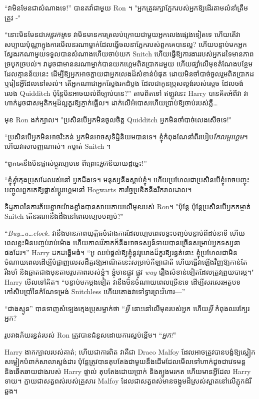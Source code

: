 “វាមិនមែនជាសំណាងទេ!” បាន​តវ៉ា​ជាមួយ Ron ។ "អ្នកត្រូវរក្សាភ្នែករបស់អ្នកឱ្យដើរតាមលំនាំត្រឹមត្រូវ -"

“នោះមិនមែនជា\emph{អន្តរកម្ម}ទេ វាមិនមានការត្រលប់ក្រោយជាមួយអ្នកលេងផ្សេងទៀតទេ ហើយតើវាសប្បាយប៉ុណ្ណាក្នុងការមើលនរណាម្នាក់ដែលធ្វើចលនាភ្នែករបស់ពួកគេបានល្អ? ហើយបន្ទាប់មកអ្នកស្វែងរកណាមួយទទួលបានសំណាងហើយចាប់យក Snitch ហើយធ្វើឱ្យការងាររបស់អ្នកដទៃមានភាពច្របូកច្របល់។ វាដូចជាមាននរណាម្នាក់បានយកហ្គេមពិតប្រាកដមួយ ហើយផ្សាំលើមុខតំណែងបន្ថែមដែលគ្មានន័យនេះ ដើម្បីឱ្យអ្នកអាចក្លាយជាអ្នកលេងដ៏សំខាន់បំផុត ដោយមិនចាំបាច់ចូលរួមពិតប្រាកដ ឬរៀនអ្វីដែលនៅសល់។ តើអ្នកណាជាអ្នកស្វែងរកដំបូង ដែលជាកូនប្រុសល្ងង់របស់ស្តេច ដែលចង់លេង Quidditch ប៉ុន្តែមិនអាចយល់ពីច្បាប់បាន?” តាមពិតទៅ ឥឡូវនេះ Harry បានគិតអំពីវា វាហាក់ដូចជាសម្មតិកម្មដ៏ល្អគួរឱ្យភ្ញាក់ផ្អើល។ ដាក់​លើ​អំបោស​ហើយ​ប្រាប់​ឱ្យ​ចាប់​របស់​ភ្លឺ​…

មុខ Ron ងក់ក្បាល។ "ប្រសិនបើអ្នកមិនចូលចិត្ត Quidditch អ្នកមិនចាំបាច់លេងសើចទេ!"

“ប្រសិន​បើ​អ្នក​មិន​អាច​រិះគន់ អ្នក​មិន​អាច​សុទិដ្ឋិនិយម​បាន​ទេ។ ខ្ញុំកំពុងណែនាំពីរបៀប\emph{កែលម្អហ្គេម}។ ហើយវាសាមញ្ញណាស់។ កម្ចាត់ Snitch ។

“ពួកគេនឹងមិនផ្លាស់ប្តូរហ្គេមទេ ពីព្រោះ\emph{អ្នក}និយាយដូច្នេះ!”

“ខ្ញុំ\emph{ខ្ញុំ}ក្មេងប្រុសដែលរស់នៅ អ្នកដឹងទេ។ មនុស្សនឹងស្តាប់ខ្ញុំ។ ហើយប្រហែលជាប្រសិនបើខ្ញុំអាចបញ្ចុះបញ្ចូលពួកគេឱ្យផ្លាស់ប្តូរហ្គេមនៅ Hogwarts ការច្នៃប្រឌិតនឹងរីករាលដាល។

ទិដ្ឋភាព​នៃ​ការ​ភ័យ​ខ្លាច​យ៉ាង​ខ្លាំង​បាន​សាយភាយ​លើ​មុខ​របស់ Ron។ "ប៉ុន្តែ ប៉ុន្តែប្រសិនបើអ្នកកម្ចាត់ Snitch តើនរណានឹងដឹងនៅពេលហ្គេមបញ្ចប់?"

“\emph{Buy…a…clock.} វានឹងមានភាពយុត្តិធម៌ជាងការដែលហ្គេមពេលខ្លះបញ្ចប់បន្ទាប់ពីដប់នាទី ហើយពេលខ្លះមិនបញ្ចប់រាប់ម៉ោង ហើយកាលវិភាគក៏នឹងអាចទស្សន៍ទាយបានច្រើនសម្រាប់អ្នកទស្សនាផងដែរ។” Harry ដកដង្ហើមធំ។ “អូ ឈប់ផ្តល់ឱ្យខ្ញុំនូវរូបរាងដ៏គួរឱ្យរន្ធត់នោះ ខ្ញុំប្រហែលជាមិនចំណាយពេលដើម្បីបំផ្លាញលេសដ៏គួរឱ្យអាណិតនេះសម្រាប់កីឡាជាតិ ហើយធ្វើវាឡើងវិញឱ្យកាន់តែរឹងមាំ និងឆ្លាតជាងមុនតាមរូបភាពរបស់ខ្ញុំ។ ខ្ញុំ​មាន​ផ្លូវ ផ្លូវ \emph{way} រឿង​សំខាន់​ទៀត​ដែល​ត្រូវ​ព្រួយ​បារម្ភ។" Harry មើលទៅគិត។ “បន្ទាប់មកម្តងទៀត វានឹងមិនចំណាយពេលច្រើនទេ ដើម្បីសរសេរអត្ថបទកៅសិបប្រាំនៃកំណែទម្រង់ Snitchless ហើយតោងវាទៅទ្វារព្រះវិហារ—”

“ជាងស្មូន” បានទាញសំឡេងក្មេងប្រុសម្នាក់ថា “\emph{អ្វី} នោះនៅលើមុខរបស់អ្នក ហើយ\emph{អ្វី} កំពុងឈរក្បែរអ្នក?

រូបរាងភ័យរន្ធត់របស់ Ron ត្រូវបានជំនួសដោយការស្អប់ខ្ពើម។ “\emph{អ្នក!}”

Harry ងាកក្បាលរបស់គាត់; ហើយជាការពិត វាគឺជា Draco Malfoy ដែលអាចត្រូវបានបង្ខំឱ្យស្លៀកសម្លៀកបំពាក់សាលាស្តង់ដារ ប៉ុន្តែត្រូវបានតុបតែងជាមួយនឹងដើមដែលមើលទៅហាក់ដូចជាវេទមន្ត និងឆើតឆាយជាងរបស់ Harry ផ្ទាល់ តុបតែងដោយប្រាក់ និងត្បូងមរកត ហើយមានអ្វីដែល Harry ទាយ។ ក្លាយជាសត្វពស់របស់គ្រួសារ Malfoy ដែលជាសត្វពស់មានចង្កូមដ៏ស្រស់ស្អាតនៅលើភ្លុកដំរីឆ្លង។

